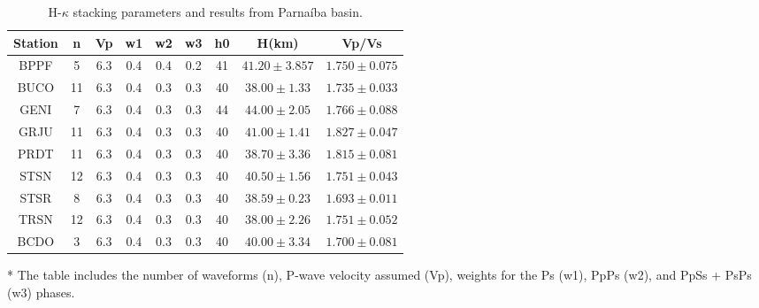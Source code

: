 \documentclass[paper,11pt]{geophysics}
\begin{document}
\begin{table}[! htpb]
\centering
	\small
	\begin{threeparttable}
	\caption{H-$\kappa$ stacking parameters and results from Parnaíba basin.}
	\begin{tabular}{c c c c c c c c c}
    \hline
    Station & n & Vp & w1 & w2 & w3 & h0 & H(km) & Vp/Vs \\ \hline		
    BPPF & 5 & 6.3 & 0.4 & 0.4 & 0.2 & 41 & $41.20 \pm3.857$ & $1.750 \pm  0.075$ \\
	BUCO & 11 & 6.3 & 0.4 & 0.3 & 0.3 & 40 & $38.00 \pm 1.33$ & $1.735 \pm 0.033$ \\
	GENI & 7 & 6.3 & 0.4 & 0.3 & 0.3 & 44 & $44.00 \pm 2.05$ & $1.766 \pm 0.088$ \\
	GRJU & 11 & 6.3 & 0.4 & 0.3 & 0.3 & 40 & $41.00 \pm 1.41$ & $1.827\pm 0.047$ \\
	PRDT & 11 & 6.3 & 0.4 & 0.3 & 0.3 & 40 & $38.70 \pm 3.36$ & $1.815 \pm 0.081$ \\
	STSN & 12 & 6.3 & 0.4 & 0.3 & 0.3 & 40 & $40.50 \pm 1.56$ & $1.751 \pm 0.043$ \\
	STSR & 8 & 6.3 & 0.4 & 0.3 & 0.3 & 40 & $38.59 \pm 0.23$ & $1.693 \pm 0.011$ \\
	TRSN & 12 & 6.3 & 0.4 & 0.3 & 0.3 & 40 & $38.00 \pm 2.26$ & $1.751 \pm 0.052$ \\
	BCDO & 3 & 6.3 & 0.4 & 0.3 & 0.3 & 40 & $40.00 \pm 3.34$ & $1.700 \pm 0.081$ \\ \hline
    \end{tabular}
	\begin{tablenotes}\footnotesize
	\item[*] The table includes the number of waveforms (n), P-wave velocity assumed (Vp), weights for the Ps (w1), PpPs (w2), and PpSs + PsPs (w3) phases.
    \end{tablenotes}
    \label{tabela_hk_stacking}
	\end{threeparttable}
\end{table}
\end{document}
